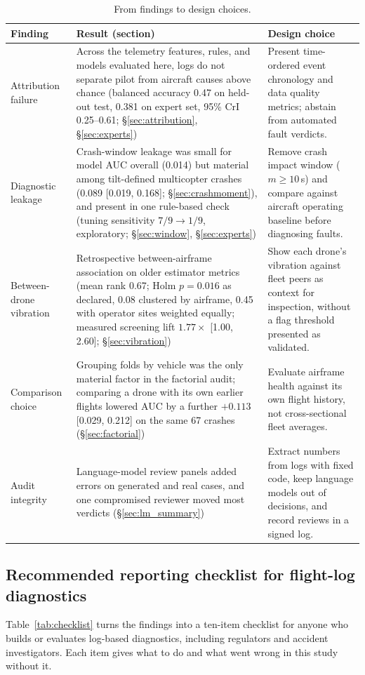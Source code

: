 \documentclass[preprint,12pt]{elsarticle}
\begin{document}
\begin{table}[!htbp]
\centering
\caption{From findings to design choices.}
\label{tab:design}
\small
\begin{tabularx}{\textwidth}{@{}l X X@{}}
\toprule
Finding & Result (section) & Design choice \\
\midrule
Attribution failure & Across the telemetry features, rules, and models evaluated here, logs do not separate pilot from aircraft causes above chance (balanced accuracy 0.47 on held-out test, 0.381 on expert set, 95\% CrI 0.25--0.61; §\ref{sec:attribution}, §\ref{sec:experts}) & Present time-ordered event chronology and data quality metrics; abstain from automated fault verdicts. \\
Diagnostic leakage & Crash-window leakage was small for model AUC overall (0.014) but material among tilt-defined multicopter crashes (0.089 [0.019, 0.168]; §\ref{sec:crashmoment}), and present in one rule-based check (tuning sensitivity $7/9 \to 1/9$, exploratory; §\ref{sec:window}, §\ref{sec:experts}) & Remove crash impact window ($m \ge 10$\,s) and compare against aircraft operating baseline before diagnosing faults. \\
Between-drone vibration & Retrospective between-airframe association on older estimator metrics (mean rank 0.67; Holm $p=0.016$ as declared, 0.08 clustered by airframe, 0.45 with operator sites weighted equally; measured screening lift $1.77\times$ [1.00, 2.60]; §\ref{sec:vibration}) & Show each drone's vibration against fleet peers as context for inspection, without a flag threshold presented as validated. \\
Comparison choice & Grouping folds by vehicle was the only material factor in the factorial audit; comparing a drone with its own earlier flights lowered AUC by a further $+0.113$ [0.029, 0.212] on the same 67 crashes (§\ref{sec:factorial}) & Evaluate airframe health against its own flight history, not cross-sectional fleet averages. \\
Audit integrity & Language-model review panels added errors on generated and real cases, and one compromised reviewer moved most verdicts (§\ref{sec:lm_summary}) & Extract numbers from logs with fixed code, keep language models out of decisions, and record reviews in a signed log. \\
\bottomrule
\end{tabularx}
\end{table}

\subsection{Recommended reporting checklist for flight-log diagnostics}
\label{sec:checklist}
Table~\ref{tab:checklist} turns the findings into a ten-item checklist for anyone who builds or evaluates log-based diagnostics, including regulators and accident investigators. Each item gives what to do and what went wrong in this study without it.
\end{document}
